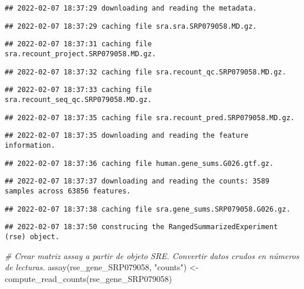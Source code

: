 \documentclass[
]{article}
\newenvironment{Shaded}{\begin{snugshade}}{\end{snugshade}}
\newcommand{\CommentTok}[1]{\textcolor[rgb]{0.56,0.35,0.01}{\textit{#1}}}
\newcommand{\FunctionTok}[1]{\textcolor[rgb]{0.00,0.00,0.00}{#1}}
\newcommand{\NormalTok}[1]{#1}
\newcommand{\OtherTok}[1]{\textcolor[rgb]{0.56,0.35,0.01}{#1}}
\newcommand{\StringTok}[1]{\textcolor[rgb]{0.31,0.60,0.02}{#1}}
\begin{document}
\begin{verbatim}
## 2022-02-07 18:37:29 downloading and reading the metadata.
\end{verbatim}

\begin{verbatim}
## 2022-02-07 18:37:29 caching file sra.sra.SRP079058.MD.gz.
\end{verbatim}

\begin{verbatim}
## 2022-02-07 18:37:31 caching file sra.recount_project.SRP079058.MD.gz.
\end{verbatim}

\begin{verbatim}
## 2022-02-07 18:37:32 caching file sra.recount_qc.SRP079058.MD.gz.
\end{verbatim}

\begin{verbatim}
## 2022-02-07 18:37:33 caching file sra.recount_seq_qc.SRP079058.MD.gz.
\end{verbatim}

\begin{verbatim}
## 2022-02-07 18:37:35 caching file sra.recount_pred.SRP079058.MD.gz.
\end{verbatim}

\begin{verbatim}
## 2022-02-07 18:37:35 downloading and reading the feature information.
\end{verbatim}

\begin{verbatim}
## 2022-02-07 18:37:36 caching file human.gene_sums.G026.gtf.gz.
\end{verbatim}

\begin{verbatim}
## 2022-02-07 18:37:37 downloading and reading the counts: 3589 samples across 63856 features.
\end{verbatim}

\begin{verbatim}
## 2022-02-07 18:37:38 caching file sra.gene_sums.SRP079058.G026.gz.
\end{verbatim}

\begin{verbatim}
## 2022-02-07 18:37:50 construcing the RangedSummarizedExperiment (rse) object.
\end{verbatim}

\begin{Shaded}
\begin{Highlighting}[]
\CommentTok{\# Crear matriz assay a partir de objeto SRE. Convertir datos crudos en números de lecturas.}
\FunctionTok{assay}\NormalTok{(rse\_gene\_SRP079058, }\StringTok{"counts"}\NormalTok{) }\OtherTok{\textless{}{-}} \FunctionTok{compute\_read\_counts}\NormalTok{(rse\_gene\_SRP079058)}
\end{Highlighting}
\end{Shaded}
\end{document}
